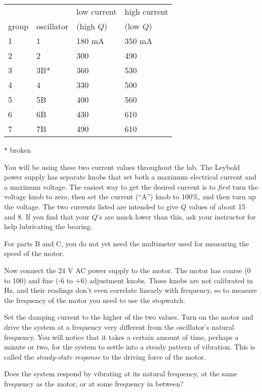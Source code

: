 \begin{tabular}{llll}
      &              & low current & high current \\
group & oscillator   & (high $Q$)  &    (low $Q$)\\
1     &      1       &   180  mA   &    350 mA \\
2     &      2       &   300       &    490  \\
3     &      3B*      &   360       &    530 \\
4     &      4       &   330       &    500  \\
5     &      5B      &   400       &    560 \\
6     &      6B      &   430       &    610  \\
7     &      7B      &   490       &    610  
\end{tabular}

* broken

You will be using these two current
values throughout the lab.
The Leybold power supply has separate knobs that set both a maximum electrical
current and a maximum voltage. The easiest way to get the desired current is to
\emph{first} turn the voltage knob to zero, then set the current (``A'') knob
to 100\%, and then turn up the voltage. The two currents listed are intended
to give $Q$ values of about 15 and 8. If you find that your $Q$'s are much
lower than this, ask your instructor for help lubricating the bearing.

For parts B and C, you do not yet need the multimeter used for measuring the speed of the motor.


Now connect the 24 V AC power supply to the motor.
The motor has coarse (0 to 100) and fine (-6 to +6) adjustment knobs.
These knobs are not
calibrated in Hz, and their readings don't even correlate linearly with
frequency, so to measure the frequency of the motor you need to use the stopwatch.

Set the damping current to the higher of the two values.
Turn on the motor and drive the system at a frequency very
different from the oscillator's natural frequency. You will notice that
it takes a certain amount of time, perhaps a minute or two,
for the system to settle into a steady pattern of vibration.
This is called the \emph{steady-state response}
 to the driving force of the motor.

Does the system respond by vibrating at its natural
frequency, at the same frequency as the motor, or at some
frequency in between?

